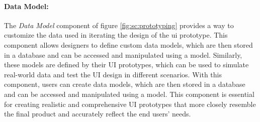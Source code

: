 \paragraph{Data Model:}
The \textit{Data Model} component of figure \ref{fig:sc:prototyping} provides a way to customize the data used in iterating the design of the \ac{ui} prototype. 
This component allows designers to define custom data models, which are then stored in a database and can be accessed and manipulated using a model.  
Similarly, these models are defined by their UI prototypes, which can be used to simulate real-world data and test the UI design in different scenarios. 
With this component, users can create data models, which are then stored in a database and can be accessed and manipulated using a model. 
This component is essential for creating realistic and comprehensive UI prototypes that more closely resemble the final product and accurately reflect the end users' needs.


